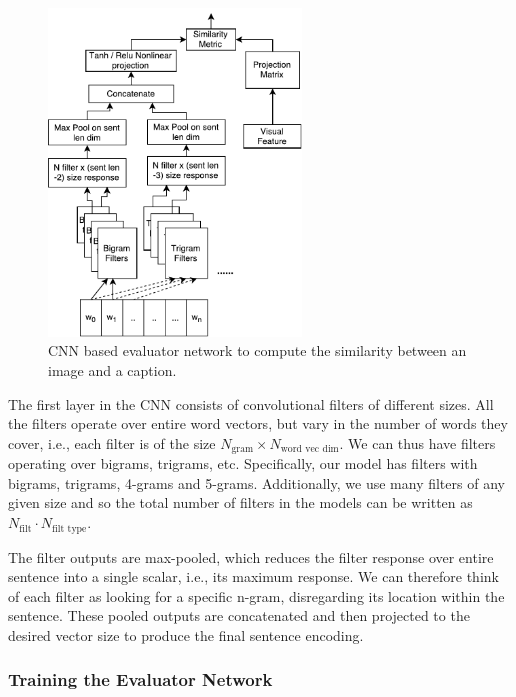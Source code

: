 \begin{figure}[t] 
  \centering
  \includegraphics[width=0.6\textwidth]{./images/CnnEval.pdf} 
  \caption{CNN based evaluator network to compute the similarity between 
    an image and a caption.}
  \label{fig:CNNEval} 
\end{figure}


The first layer in the CNN consists of convolutional filters of different sizes.  
All the filters operate over entire word vectors, but vary in the number of
words they cover, i.e., each filter is of the size $N_{\text{gram}} \times
N_{\text{word vec dim}}$. 
We can thus have filters operating over bigrams, trigrams, etc.
Specifically, our model has filters with bigrams, trigrams, 4-grams and 5-grams. 
Additionally, we use many filters of any given size and so the total number of
filters in the models can be written as $N_{\text{filt}} \cdot N_{\text{filt
type}}$.

The filter outputs are max-pooled, which reduces the filter response over entire
sentence into a single scalar, i.e., its maximum response. 
We can therefore think of each filter as looking for a specific n-gram,
disregarding its location within the sentence.
These pooled outputs are concatenated and then projected to the desired vector
size to produce the final sentence encoding.


\subsubsection{Training the Evaluator Network}

